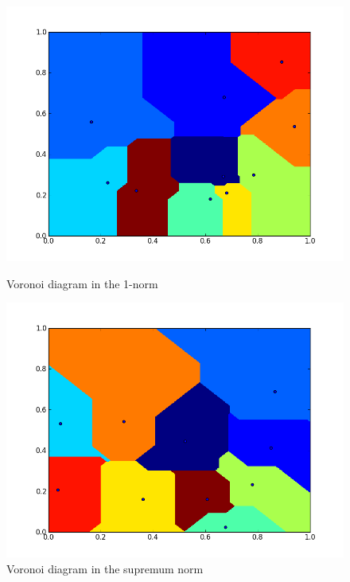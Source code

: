 \begin{figure}
\begin{minipage}[b]{0.45\linewidth}
\centering
\includegraphics[width=\textwidth]{voronoi_1norm.png}
\caption{Voronoi diagram in the 1-norm}
\label{voronoi_1norm}
\end{minipage}
\hspace{0.5cm}
\begin{minipage}[b]{0.45\linewidth}
\centering
\includegraphics[width=\textwidth]{voronoi_supnorm.png}
\caption{Voronoi diagram in the supremum norm}
\label{voronoi_supnorm}
\end{minipage}
\end{figure}

